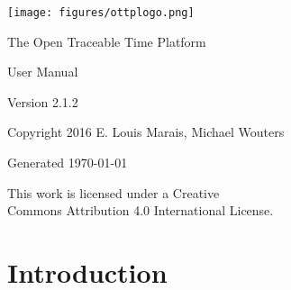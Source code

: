 \documentclass[11pt,a4paper,openany,oneside]{book}
\begin{document}
\begin{titlepage}

\begin{center}
\centerline{\texttt{[image: figures/ottplogo.png]}}
\end{center}

\vspace*{4cm} 

\begin{center}
{\Huge The Open Traceable Time Platform}
\end{center}

\vspace*{4cm} 

\begin{center}
{\Huge User Manual}
\end{center}

\vspace*{4cm}

\begin{center}
Version 2.1.2
\end{center}

\begin{center}
Copyright 2016 E. Louis Marais, Michael Wouters
\end{center}

\begin{center}
Generated \today
\end{center}

\end{titlepage}


\begin{titlepage}

\begin{center}
{\Large This work is licensed under a Creative \\
Commons Attribution 4.0 International License.}
\end{center}

\end{titlepage}

\tableofcontents
\listoffigures
\listoftables

\lstset{
	xleftmargin=24pt,
	basewidth=0.5em,
	basicstyle=\ttfamily,
	escapechar=\%
}

\chapter{Introduction}
\end{document}
